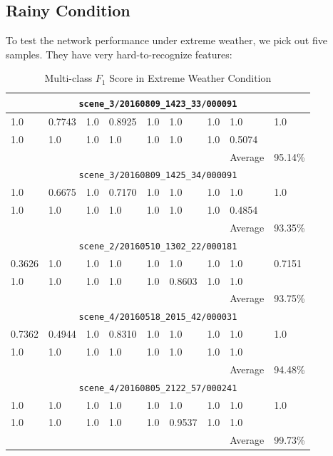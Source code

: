 \begin{spacing}{1.5}
\section{Rainy Condition}
\label{sec:EX_rainy}

To test the network performance under extreme weather, we pick out five samples. They have very hard-to-recognize features: 

\begin{table}[p]
\centering
\caption{Multi-class $F_1$ Score in Extreme Weather Condition}
\label{tab:rainyf1}
\begin{tabular}{@{}lllllllll@{}}
\toprule
\multicolumn{9}{c}{\texttt{scene\_3/20160809\_1423\_33/000091}} \\ \midrule
1.0 & 0.7743 & 1.0 & 0.8925 & 1.0 & 1.0 & 1.0 & 1.0 & 1.0 \\
1.0 & 1.0 & 1.0 & 1.0 & 1.0 & 1.0 & 1.0 & 0.5074 &  \\
 &  &  &  &  &  &  & Average & 95.14\% \\ \midrule
\multicolumn{9}{c}{\texttt{scene\_3/20160809\_1425\_34/000091}} \\ \midrule
1.0 & 0.6675 & 1.0 & 0.7170 & 1.0 & 1.0 & 1.0 & 1.0 & 1.0 \\
1.0 & 1.0 & 1.0 & 1.0 & 1.0 & 1.0 & 1.0 & 0.4854 &  \\
 &  &  &  &  &  &  & Average & 93.35\% \\ \midrule
\multicolumn{9}{c}{\texttt{scene\_2/20160510\_1302\_22/000181}} \\ \midrule
0.3626 & 1.0 & 1.0 & 1.0 & 1.0 & 1.0 & 1.0 & 1.0 & 0.7151 \\
1.0 & 1.0 & 1.0 & 1.0 & 1.0 & 0.8603 & 1.0 & 1.0 &  \\
 &  &  &  &  &  &  & Average & 93.75\% \\ \midrule
\multicolumn{9}{c}{\texttt{scene\_4/20160518\_2015\_42/000031}} \\ \midrule
0.7362 & 0.4944 & 1.0 & 0.8310 & 1.0 & 1.0 & 1.0 & 1.0 & 1.0 \\
1.0 & 1.0 & 1.0 & 1.0 & 1.0 & 1.0 & 1.0 & 1.0 &  \\
 &  &  &  &  &  &  & Average & 94.48\% \\ \midrule
\multicolumn{9}{c}{\texttt{scene\_4/20160805\_2122\_57/000241}} \\ \midrule
1.0 & 1.0 & 1.0 & 1.0 & 1.0 & 1.0 & 1.0 & 1.0 & 1.0 \\
1.0 & 1.0 & 1.0 & 1.0 & 1.0 & 0.9537 & 1.0 & 1.0 &  \\
 &  &  &  &  &  &  & Average & 99.73\% \\ \bottomrule
\end{tabular}
\end{table}



\end{spacing}
